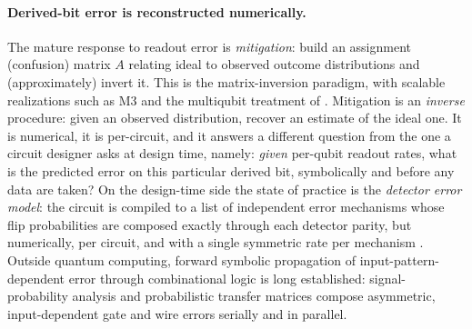 \documentclass[11pt]{article}
\numberwithin{equation}{section}
\theoremstyle{plain}
\theoremstyle{definition}
\theoremstyle{remark}
\begin{document}
\paragraph{Derived-bit error is reconstructed numerically.} The mature response
to readout error is \emph{mitigation}: build an assignment (confusion) matrix $A$
relating ideal to observed outcome distributions and (approximately) invert it.
This is the matrix-inversion paradigm, with scalable realizations such as M3
\citep{nation2021m3} and the multiqubit treatment of \citet{bravyi2021mitigating}.
Mitigation is an \emph{inverse} procedure: given an observed distribution, recover
an estimate of the ideal one. It is numerical, it is per-circuit, and it answers
a different question from the one a circuit designer asks at design time, namely:
\emph{given} per-qubit readout rates, what is the predicted error on this
particular derived bit, symbolically and before any data are taken? On the
design-time side the state of practice is the \emph{detector error model}: the
circuit is compiled to a list of independent error mechanisms whose flip
probabilities are composed exactly through each detector parity, but
numerically, per circuit, and with a single symmetric rate per mechanism
\citep{gidney2021stim}. Outside quantum computing, forward symbolic
propagation of input-pattern-dependent error through combinational logic is
long established: signal-probability analysis \citep{parker1975probabilistic}
and probabilistic transfer matrices \citep{krishnaswamy2008ptm} compose
asymmetric, input-dependent gate and wire errors serially and in parallel.
\end{document}

